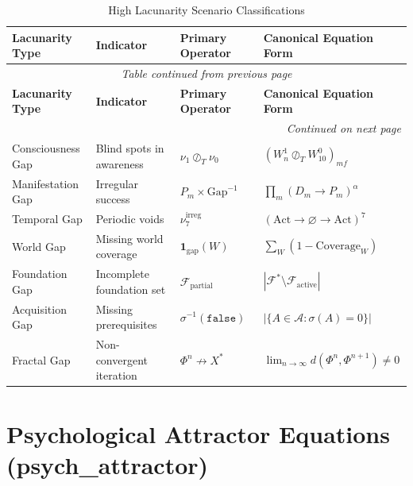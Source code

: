 \documentclass[11pt,twoside]{book}
\renewcommand{\arraystretch}{1.2}  %
\newcommand{\noe}[1]{\nu_{#1}}
\newcommand{\Foundations}{\mathcal{F}}
\newcommand{\Acquisitions}{\mathcal{A}}
\newcommand{\Frac}{\Phi}
\newcommand{\Tdiv}{\oslash_T}
\begin{document}
\begin{center}
\small
\renewcommand{\arraystretch}{1.3}
\begin{longtable}{p{2cm}|p{2.5cm}|p{2.5cm}|p{3.5cm}}
\caption{High Lacunarity Scenario Classifications} \\
\toprule
\textbf{Lacunarity Type} & \textbf{Indicator} & \textbf{Primary Operator} & \textbf{Canonical Equation Form} \\
\midrule
\endfirsthead
\multicolumn{4}{c}{\textit{Table continued from previous page}} \\
\toprule
\textbf{Lacunarity Type} & \textbf{Indicator} & \textbf{Primary Operator} & \textbf{Canonical Equation Form} \\
\midrule
\endhead
\midrule
\multicolumn{4}{r}{\textit{Continued on next page}} \\
\endfoot
\bottomrule
\endlastfoot
Consciousness Gap & Blind spots in awareness & $\noe{1} \Tdiv \noe{0}$ & $(W_n^1 \Tdiv W_{10}^0)_{mf}$ \\
Manifestation Gap & Irregular success & $P_m \times \mathrm{Gap}^{-1}$ & $\prod_m (D_m \to P_m)^{\alpha}$ \\
Temporal Gap & Periodic voids & $\noe{7}^{\mathrm{irreg}}$ & $(\mathrm{Act} \to \varnothing \to \mathrm{Act})^7$ \\
World Gap & Missing world coverage & $\mathbf{1}_{\mathrm{gap}}(W)$ & $\sum_W (1 - \mathrm{Coverage}_W)$ \\
Foundation Gap & Incomplete foundation set & $\Foundations_{\mathrm{partial}}$ & $|\Foundations^* \setminus \Foundations_{\mathrm{active}}|$ \\
Acquisition Gap & Missing prerequisites & $\sigma^{-1}(\mathtt{false})$ & $|\{A \in \Acquisitions : \sigma(A) = 0\}|$ \\
Fractal Gap & Non-convergent iteration & $\Frac^n \not\to X^*$ & $\lim_{n \to \infty} d(\Frac^n, \Frac^{n+1}) \neq 0$ \\
\end{longtable}
\end{center}

\chapter{Psychological Attractor Equations (psych\_attractor)}
\label{ch:psych-attractor}
\end{document}
